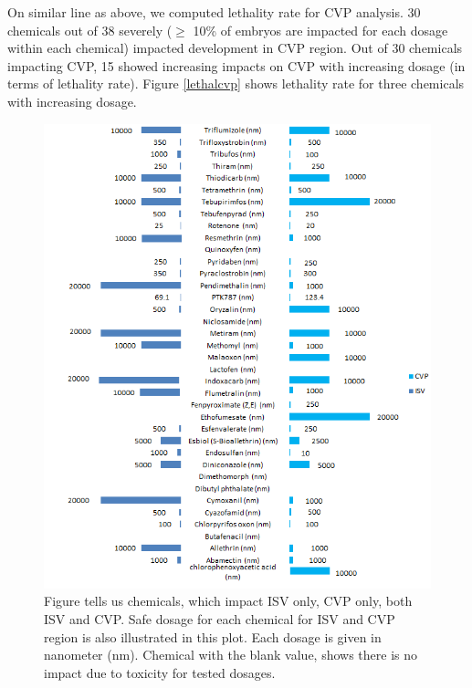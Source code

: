On similar line as above, we computed lethality rate for CVP analysis. 30 chemicals out of 38 severely ($\geq$ 10\% of embryos are impacted for each dosage within each chemical) impacted development in CVP region. Out of 30 chemicals impacting CVP, 15 showed increasing impacts on CVP with increasing dosage (in terms of lethality rate). Figure \ref{lethalcvp} shows lethality rate for three chemicals with increasing dosage.



\begin{figure}[H]\centering
  \begin{center}
    \includegraphics[scale=0.8]{figure/chemicalProfile.png}
  \end{center}
  \caption[Safe Dosage for ISV and CVP]{Figure tells us chemicals, which impact ISV only, CVP only, both ISV and CVP. Safe dosage for each chemical for ISV and CVP region is also illustrated in this plot. Each dosage is given in nanometer (nm). Chemical with the blank value, shows there is no impact due to toxicity for tested dosages.}
  \label{lethalcvpisv}
\end{figure}

